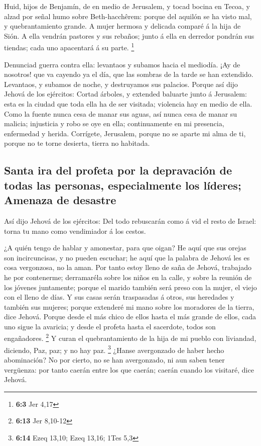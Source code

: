  Huid, hijos de Benjamín, de en medio de Jerusalem, y tocad
bocina en Tecoa, y alzad por señal humo sobre Beth-hacchêrem: porque del
aquilón se ha visto mal, y quebrantamiento grande.  A mujer
hermosa y delicada comparé á la hija de Sión.  A ella
vendrán pastores y sus rebaños; junto á ella en derredor pondrán sus
tiendas; cada uno apacentará á su parte. \footnote{\textbf{6:3} Jer 4,17}

 Denunciad guerra contra ella: levantaos y subamos hacia el
mediodía. ¡Ay de nosotros! que va cayendo ya el día, que las sombras de
la tarde se han extendido.  Levantaos, y subamos de noche, y
destruyamos sus palacios.  Porque así dijo Jehová de los
ejércitos: Cortad árboles, y extended baluarte junto á Jerusalem: esta
es la ciudad que toda ella ha de ser visitada; violencia hay en medio de
ella.  Como la fuente nunca cesa de manar sus aguas, así
nunca cesa de manar su malicia; injusticia y robo se oye en ella;
continuamente en mi presencia, enfermedad y herida. 
Corrígete, Jerusalem, porque no se aparte mi alma de ti, porque no te
torne desierta, tierra no habitada.

\hypertarget{santa-ira-del-profeta-por-la-depravaciuxf3n-de-todas-las-personas-especialmente-los-luxedderes-amenaza-de-desastre}{%
\subsection{Santa ira del profeta por la depravación de todas las
personas, especialmente los líderes; Amenaza de
desastre}\label{santa-ira-del-profeta-por-la-depravaciuxf3n-de-todas-las-personas-especialmente-los-luxedderes-amenaza-de-desastre}}

 Así dijo Jehová de los ejércitos: Del todo rebuscarán como
á vid el resto de Israel: torna tu mano como vendimiador á los cestos.

 ¿A quién tengo de hablar y amonestar, para que oigan? He
aquí que sus orejas son incircuncisas, y no pueden escuchar; he aquí que
la palabra de Jehová les es cosa vergonzosa, no la aman. 
Por tanto estoy lleno de saña de Jehová, trabajado he por contenerme;
derramaréla sobre los niños en la calle, y sobre la reunión de los
jóvenes juntamente; porque el marido también será preso con la mujer, el
viejo con el lleno de días.  Y sus casas serán traspasadas
á otros, sus heredades y también sus mujeres; porque extenderé mi mano
sobre los moradores de la tierra, dice Jehová.  Porque
desde el más chico de ellos hasta el más grande de ellos, cada uno sigue
la avaricia; y desde el profeta hasta el sacerdote, todos son
engañadores. \footnote{\textbf{6:13} Jer 8,10-12}  Y curan
el quebrantamiento de la hija de mi pueblo con liviandad, diciendo, Paz,
paz; y no hay paz. \footnote{\textbf{6:14} Ezeq 13,10; Ezeq 13,16; 1Tes
  5,3}  ¿Hanse avergonzado de haber hecho abominación? No
por cierto, no se han avergonzado, ni aun saben tener vergüenza: por
tanto caerán entre los que caerán; caerán cuando los visitaré, dice
Jehová.

